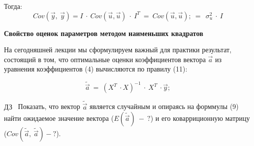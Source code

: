\documentclass[12pt,a4paper]{article}
\begin{document}
Тогда:
\begin{equation*}
Cov\left(\vec{y} ,\ \vec{y}\right) =I\ \cdot \ Cov\left(\vec{u} ,\vec{u}\right) \ \cdot \ I^{T} \ =\ Cov\left(\vec{u} ,\vec{u}\right) ;\ =\ \ \sigma ^{2}_{u} \ \cdot \ I
\end{equation*}
\begin{center}

\textbf{Свойство оценок параметров методом наименьших квадратов}
\end{center}
На сегодняшней лекции мы сформулируем важный для практики результат, состоящий в том, что оптимальные оценки коэффициентов вектора $\displaystyle \vec{a}$ из уравнения коэффициентов (4) вычисляются по правилу (11):


\begin{equation*}
\widetilde{\vec{a}} \ =\ \left( X^{T} \ \cdot X\right)^{-1} \ \cdot \ X^{T} \ \cdot \vec{y} ;
\end{equation*}


$\displaystyle \boxed{\text{ДЗ}}$ \ Показать, что вектор $\displaystyle \widetilde{\vec{a}}$ является случайным и опираясь на форммулы (9) найти ожидаемое значение вектора ($\displaystyle E\left(\widetilde{\vec{a}}\right) \ -\ ?$) и его коварриционную матрицу ($\displaystyle Cov\left(\widetilde{\vec{a}} ,\ \widetilde{\vec{a}}\right) -?$).
\end{document}
